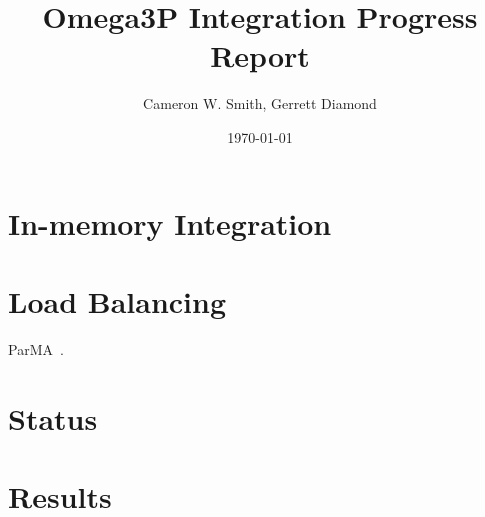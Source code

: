 \documentclass[a4paper]{article}
\title{Omega3P Integration Progress Report}
\author{Cameron W. Smith, Gerrett Diamond}
\date{\today}
\begin{document}
\maketitle

\section{In-memory Integration}



\section{Load Balancing}
ParMA~\cite{SmithParma2015}.

\section{Status}

\section{Results}


\newpage


\end{document}
